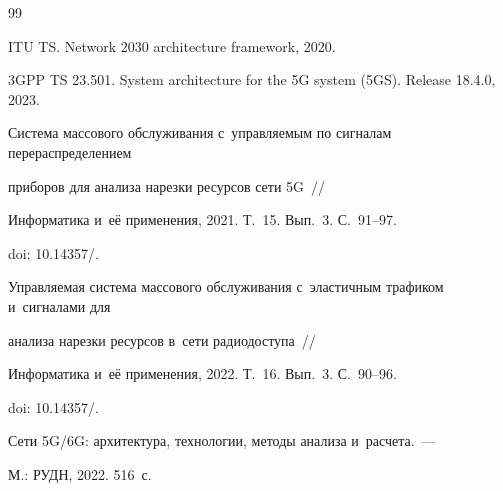 {\small\frenchspacing


{\baselineskip=10.55pt




\begin{thebibliography}{99}




ITU TS. Network 2030 architecture framework, 2020.







3GPP TS 23.501. System architecture for the 5G system (5GS).  Release  18.4.0, 2023.









Система массового обслуживания с~управ\-ля\-емым по сигналам перераспределением 


приборов для анализа нарезки ресурсов сети 5G~/\!\!/


Информатика и~её применения, 2021. Т.~15. Вып.~3. С.~91--97.


doi: 10.14357\!/.









Управляемая сис\-те\-ма массового обслуживания с~эластичным трафиком и~сигналами для 


анализа нарезки ресурсов в~сети радиодоступа~/\!\!/


Информатика и~её применения, 2022. Т.~16. Вып.~3. С.~90--96.


doi: 10.14357\!/.









Сети 5G\!/\!6G: архитектура, технологии, методы анализа и~расчета.~--- 


М.: РУДН, 2022. 516~с.








\end{thebibliography}}}
